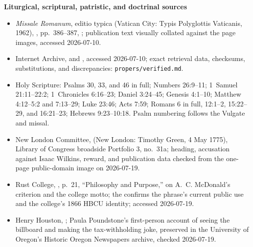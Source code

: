 \begin{deepstudy}
\textbf{Liturgical, scriptural, patristic, and doctrinal sources}
{\footnotesize
\begin{itemize}[itemsep=0em,topsep=0.15em,parsep=0pt]
\item \emph{Missale Romanum}, editio typica (Vatican City: Typis Polyglottis Vaticanis, 1962), , pp.~386--387, ; publication text visually collated against the page images, accessed 2026-07-10.
\item Internet Archive,  and , accessed 2026-07-10; exact retrieval data, checksums, substitutions, and discrepancies: \texttt{propers/verified.md}.
\item Holy Scripture: Psalms 30, 33, and 46 in full; Numbers 26:9--11; 1~Samuel 21:11--22:2; 1~Chronicles 6:16--23; Daniel 3:24--45; Genesis 4:1--10; Matthew 4:12--5:2 and 7:13--29; Luke 23:46; Acts 7:59; Romans 6 in full, 12:1--2, 15:22--29, and 16:21--23; Hebrews 9:23--10:18. Psalm numbering follows the Vulgate and missal.
\item New London Committee,  (New London: Timothy Green, 4 May 1775), Library of Congress broadside Portfolio 3, no.~31a; heading, accusation against Isaac Wilkins, reward, and publication data checked from the one-page public-domain image on 2026-07-19.
\item Rust College, , p.~21, ``Philosophy and Purpose,'' on A.~C. McDonald's criterion and the college motto; the  confirms the phrase's current public use and the college's 1866 HBCU identity; accessed 2026-07-19.
\item Henry Houston, ; Paula Poundstone's first-person account of seeing the billboard and making the tax-withholding joke, preserved in the University of Oregon's Historic Oregon Newspapers archive, checked 2026-07-19.

\end{itemize}}
\end{deepstudy}
